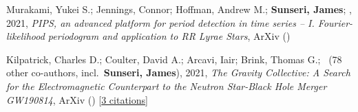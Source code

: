 \item Murakami, Yukei S.; Jennings, Connor; Hoffman, Andrew M.; \textbf{Sunseri, James}; \etal, 2021, \emph{PIPS, an advanced platform for period detection in time series -- I. Fourier-likelihood periodogram and application to RR Lyrae Stars}, ArXiv ()

\item Kilpatrick, Charles D.; Coulter, David A.; Arcavi, Iair; Brink, Thomas G.; \etal\ ({78} other co-authors, incl.\ \textbf{Sunseri, James}), 2021, \emph{The Gravity Collective: A Search for the Electromagnetic Counterpart to the Neutron Star-Black Hole Merger GW190814}, ArXiv () [\href{https://ui.adsabs.harvard.edu/abs/2021arXiv210606897K}{3 citations}]